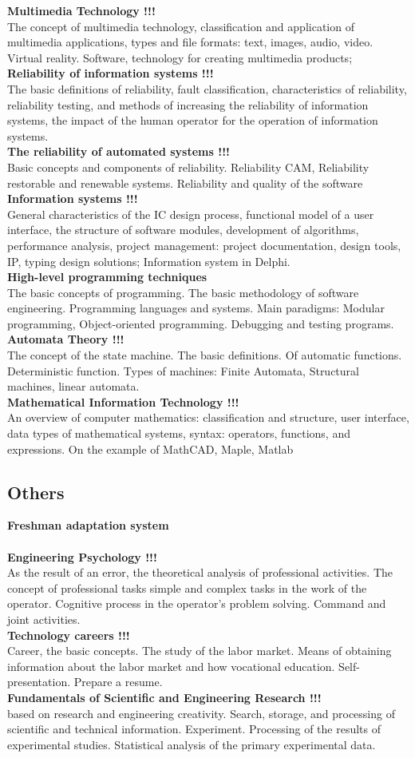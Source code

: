 \documentclass[a4paper, 12pt]{article}
\newcommand{\group}[1] {\subsection{#1}}
\newcommand{\discipline}[1] {\textbf{#1} \\ }
\newcommand{\desc}[1] { #1 \\ }
\begin{document}
\discipline{Multimedia Technology !!!}
\desc{The concept of multimedia technology, classification and application of multimedia applications, types and file formats: text, images, audio, video. Virtual reality. Software, technology for creating multimedia products;}

\discipline{Reliability of information systems !!!}
\desc{The basic definitions of reliability, fault classification, characteristics of reliability, reliability testing, and methods of increasing the reliability of information systems, the impact of the human operator for the operation of information systems.}

\discipline{The reliability of automated systems !!!}
\desc{Basic concepts and components of reliability. Reliability CAM, Reliability restorable and renewable systems. Reliability and quality of the software}

\discipline{Information systems !!!}
\desc{General characteristics of the IC design process, functional model of a user interface, the structure of software modules, development of algorithms, performance analysis, project management: project documentation, design tools, IP, typing design solutions; Information system in Delphi.}

\discipline{High-level programming techniques}
\desc{The basic concepts of programming. The basic methodology of software engineering. Programming languages ​​and systems. Main paradigms: Modular programming, Object-oriented programming. Debugging and testing programs.}

\discipline{Automata Theory !!!}
\desc{The concept of the state machine. The basic definitions. Of automatic functions. Deterministic function. Types of machines: Finite Automata, Structural machines, linear automata.}

\discipline{Mathematical Information Technology !!!}
\desc{An overview of computer mathematics: classification and structure, user interface, data types of mathematical systems, syntax: operators, functions, and expressions. On the example of MathCAD, Maple, Matlab}


\group{Others}

\discipline{Freshman adaptation system}
\desc{}

\discipline{Engineering Psychology !!!}
\desc{As the result of an error, the theoretical analysis of professional activities. The concept of professional tasks simple and complex tasks in the work of the operator. Cognitive process in the operator's problem solving. Command and joint activities.}

\discipline{Technology careers !!!}
\desc{Career, the basic concepts. The study of the labor market. Means of obtaining information about the labor market and how vocational education. Self-presentation. Prepare a resume.}

\discipline{Fundamentals of Scientific and Engineering Research !!!}
\desc{based on research and engineering creativity. Search, storage, and processing of scientific and technical information. Experiment. Processing of the results of experimental studies. Statistical analysis of the primary experimental data.}
\end{document}
